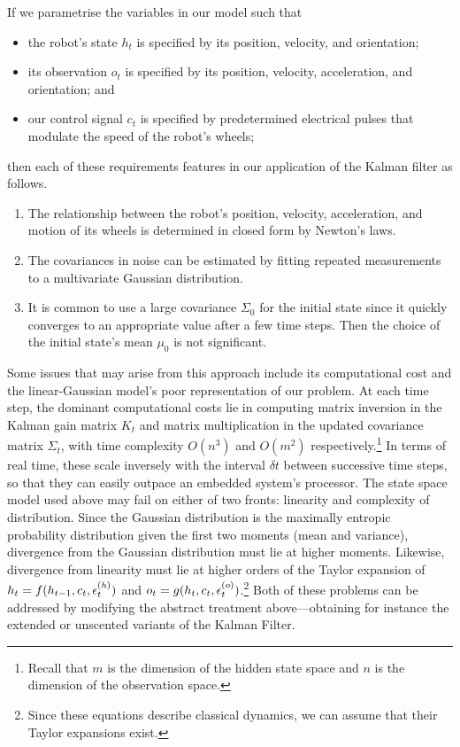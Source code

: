         If we parametrise the variables in our model such that
        \begin{itemize}
            \item the robot's state $h_t$ is specified by its position, velocity, and orientation;
            \item its observation $o_t$ is specified by its position, velocity, acceleration, and orientation; and
            \item our control signal $c_t$ is specified by predetermined electrical pulses that modulate the speed of the robot's wheels;
        \end{itemize}
        then each of these requirements features in our application of the Kalman filter as follows.
        \begin{enumerate}
            \item The relationship between the robot's position, velocity, acceleration, and motion of its wheels is determined in closed form by Newton's laws.
            \item The covariances in noise can be estimated by fitting repeated measurements to a multivariate Gaussian distribution.
            \item It is common to use a large covariance $\Sigma_0$ for the initial state since it quickly converges to an appropriate value after a few time steps.
                Then the choice of the initial state's mean $\mu_0$ is not significant.\cite{murphy}
        \end{enumerate}

        Some issues that may arise from this approach include its computational cost and the linear-Gaussian model's poor representation of our problem.
        At each time step, the dominant computational costs lie in computing matrix inversion in the Kalman gain matrix $K_t$ and matrix multiplication in the updated covariance matrix $\Sigma_t$, with time complexity $O(n^3)$ and $O(m^2)$ respectively.\footnote{Recall that $m$ is the dimension of the hidden state space and $n$ is the dimension of the observation space.}
        In terms of real time, these scale inversely with the interval $\delta t$ between successive time steps, so that they can easily outpace an embedded system's processor.
        The state space model used above may fail on either of two fronts: linearity and complexity of distribution.
        Since the Gaussian distribution is the maximally entropic probability distribution given the first two moments (mean and variance), divergence from the Gaussian distribution must lie at higher moments.
        Likewise, divergence from linearity must lie at higher orders of the Taylor expansion of $h_t = f(h_{t-1}, c_t, \epsilon^{(h)}_t)$ and $o_t = g(h_{t}, c_t, \epsilon^{(o)}_t)$.\footnote{Since these equations describe classical dynamics, we can assume that their Taylor expansions exist.}
        Both of these problems can be addressed by modifying the abstract treatment above---obtaining for instance the extended or unscented variants of the Kalman Filter.


